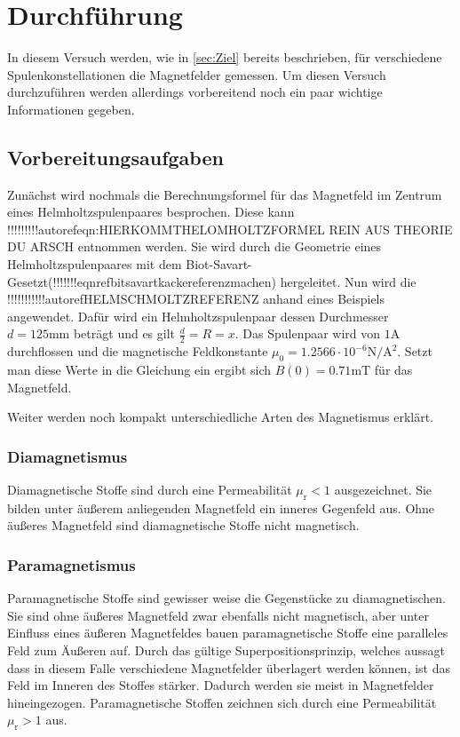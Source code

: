 \section{Durchführung}
\label{sec:Durchführung}
In diesem Versuch werden, wie in \autoref{sec:Ziel} bereits beschrieben, für verschiedene Spulenkonstellationen die Magnetfelder gemessen. Um diesen Versuch durchzuführen werden
allerdings vorbereitend noch ein paar wichtige Informationen gegeben.
\subsection{Vorbereitungsaufgaben}
\label{subsec:VBA}
Zunächst wird nochmals die Berechnungsformel für das Magnetfeld im Zentrum eines Helmholtzspulenpaares besprochen. Diese kann !!!!!!!!!autoref{eqn:HIERKOMMTHELOMHOLTZFORMEL REIN AUS THEORIE DU ARSCH}
entnommen werden. Sie wird durch die Geometrie eines Helmholtzspulenpaares mit dem Biot-Savart-Gesetzt(!!!!!!!eqnref{bitsavartkackereferenzmachen}) hergeleitet. Nun wird die !!!!!!!!!!!autoref{HELMSCHMOLTZREFERENZ}
anhand eines Beispiels angewendet. Dafür wird ein Helmholtzspulenpaar dessen Durchmesser $d = 125\unit{\milli\metre}$ beträgt und es gilt $\frac{d}{2} = R = x$. Das Spulenpaar 
wird von $1\unit{\ampere}$ durchflossen und die magnetische Feldkonstante $\mu_0 = 1.2566\cdot 10^{-6} \unit{\newton\per\ampere\squared}$. Setzt man diese Werte in die Gleichung ein
ergibt sich $B(0) = 0.71\unit{\milli\tesla}$ für das Magnetfeld. 


Weiter werden noch kompakt unterschiedliche Arten des Magnetismus erklärt. 
\subsubsection{Diamagnetismus}
\label{subsubsec:DIA}
Diamagnetische Stoffe sind durch eine Permeabilität $\mu_{\text{r}} < 1$ ausgezeichnet. Sie bilden unter äußerem anliegenden Magnetfeld ein inneres Gegenfeld aus. Ohne äußeres Magnetfeld sind 
diamagnetische Stoffe nicht magnetisch. 
\subsubsection{Paramagnetismus}
\label{subsubsec:PARA}
Paramagnetische Stoffe sind gewisser weise die Gegenstücke zu diamagnetischen. Sie sind ohne äußeres Magnetfeld zwar ebenfalls nicht magnetisch, aber unter Einfluss eines äußeren 
Magnetfeldes bauen paramagnetische Stoffe eine paralleles Feld zum Äußeren auf. Durch das gültige Superpositionsprinzip, welches aussagt dass in diesem Falle verschiedene Magnetfelder
überlagert werden können, ist das Feld im Inneren des Stoffes stärker. Dadurch werden sie meist in Magnetfelder hineingezogen. Paramagnetische Stoffen zeichnen sich durch eine 
Permeabilität $\mu_{\text{r}} > 1$ aus. 
